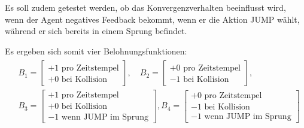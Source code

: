\par 
Es soll zudem getestet werden, ob das Konvergenzverhalten beeinflusst wird, wenn der Agent negatives Feedback bekommt, wenn er die Aktion JUMP wählt, während er sich bereits in einem Sprung befindet. 
\par
Es ergeben sich somit vier Belohnungsfunktionen:
\begin{multline}
    \begin{aligned}
& B_{1} =  \begin{bmatrix} +1 \text{ pro Zeitstempel}\\  +0 \text{ bei Kollision} \end{bmatrix}, \quad
B_{2} =  \begin{bmatrix} +0 \text{ pro Zeitstempel} \\ -1 \text{ bei Kollision}   \end{bmatrix}, \\
& B_{3} =  \begin{bmatrix}  +1 \text{ pro Zeitstempel}\\  +0 \text{ bei Kollision} \\ -1 \text{ wenn JUMP im Sprung}   \end{bmatrix},
B_{4} =  \begin{bmatrix} +0 \text{ pro Zeitstempel} \\ -1 \text{ bei Kollision} \\  -1 \text{ wenn JUMP im Sprung}   \end{bmatrix}
\end{aligned}
\end{multline}